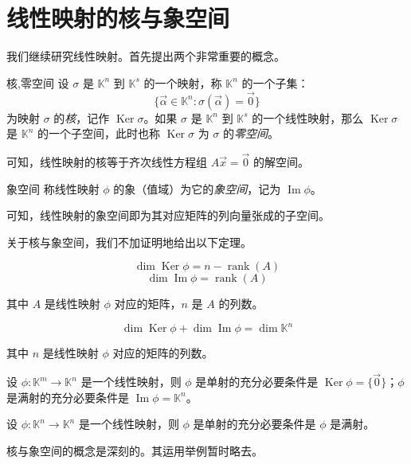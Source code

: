 
\section{线性映射的核与象空间}

我们继续研究线性映射。首先提出两个非常重要的概念。

\begin{definition}{核,零空间}
	设 $\sigma$ 是 $\mathbb K^n$ 到 $\mathbb K^s$ 的一个映射，称 $\mathbb K^n$ 的一个子集：
	$$
	\{ \vec \alpha \in \mathbb K^n \colon \sigma (\vec \alpha) = \vec 0 \}
	$$
	为映射 $\sigma$ 的\emph{核}，记作 $\operatorname{Ker} \sigma$。如果 $\sigma$ 是 $\mathbb K^n$ 到 $\mathbb K^s$ 的一个线性映射，那么 $\operatorname{Ker} \sigma$ 是 $\mathbb K^n$ 的一个子空间，此时也称 $\operatorname{Ker} \sigma$ 为 $\sigma$ 的\emph{零空间}。
\end{definition}

可知，线性映射的核等于齐次线性方程组 $A \vec x = \vec 0$ 的解空间。

\begin{definition}{象空间}
	称线性映射 $\phi$ 的象（值域）为它的\emph{象空间}，记为 $\operatorname{Im} \phi$。
\end{definition}

可知，线性映射的象空间即为其对应矩阵的列向量张成的子空间。

关于核与象空间，我们不加证明地给出以下定理。

\begin{theorem}
	$$
	\dim \operatorname{Ker} \phi = n - \operatorname{rank}(A)
	$$$$
	\dim \operatorname{Im} \phi = \operatorname{rank}(A)
	$$

	其中 $A$ 是线性映射 $\phi$ 对应的矩阵，$n$ 是 $A$ 的列数。
\end{theorem}

\begin{theorem}
	$$
	\dim \operatorname{Ker} \phi + \dim \operatorname{Im} \phi = \dim \mathbb K^n
	$$

	其中 $n$ 是线性映射 $\phi$ 对应的矩阵的列数。
\end{theorem}

\begin{theorem}
	设 $\phi \colon \mathbb K^m \to \mathbb K^n$ 是一个线性映射，则 $\phi$ 是单射的充分必要条件是 $\operatorname{Ker} \phi = \{ \vec 0 \}$；$\phi$ 是满射的充分必要条件是 $\operatorname{Im} \phi = \mathbb K^n$。
\end{theorem}

\begin{theorem}
	设 $\phi \colon \mathbb K^n \to \mathbb K^n$ 是一个线性映射，则 $\phi$ 是单射的充分必要条件是 $\phi$ 是满射。
\end{theorem}

核与象空间的概念是深刻的。其运用举例暂时略去。

